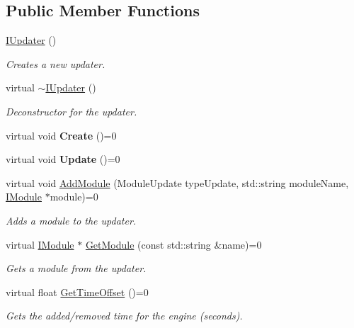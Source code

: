 \subsection*{Public Member Functions}
\begin{DoxyCompactItemize}
\item 
\hyperlink{class_flounder_1_1_i_updater_ab07ce766ae1ec647c853fb136671e2c7}{I\+Updater} ()
\begin{DoxyCompactList}\small\item\em Creates a new updater. \end{DoxyCompactList}\item 
virtual \hyperlink{class_flounder_1_1_i_updater_ab1b3c5fc8bd07bbe6c5d0eb2347622fb}{$\sim$\+I\+Updater} ()
\begin{DoxyCompactList}\small\item\em Deconstructor for the updater. \end{DoxyCompactList}\item 
\mbox{\label{class_flounder_1_1_i_updater_ad6fa01d2af54060517afd3bda784e214}} 
virtual void {\bfseries Create} ()=0
\item 
\mbox{\label{class_flounder_1_1_i_updater_af59a4f02830da88fde5ba38d80118c3b}} 
virtual void {\bfseries Update} ()=0
\item 
virtual void \hyperlink{class_flounder_1_1_i_updater_a1a2b81edf11b440487c55e0784aae98d}{Add\+Module} (Module\+Update type\+Update, std\+::string module\+Name, \hyperlink{class_flounder_1_1_i_module}{I\+Module} $\ast$module)=0
\begin{DoxyCompactList}\small\item\em Adds a module to the updater. \end{DoxyCompactList}\item 
virtual \hyperlink{class_flounder_1_1_i_module}{I\+Module} $\ast$ \hyperlink{class_flounder_1_1_i_updater_a074668562d355a9130c2048b32a8f422}{Get\+Module} (const std\+::string \&name)=0
\begin{DoxyCompactList}\small\item\em Gets a module from the updater. \end{DoxyCompactList}\item 
virtual float \hyperlink{class_flounder_1_1_i_updater_a5cf09c1bdf1169168f08a0ac1a98b85f}{Get\+Time\+Offset} ()=0
\begin{DoxyCompactList}\small\item\em Gets the added/removed time for the engine (seconds). \end{DoxyCompactList}\item 

\end{DoxyCompactItemize}
